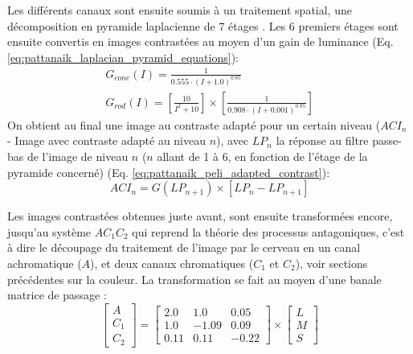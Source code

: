 	\par Les différents canaux sont ensuite soumis à un traitement spatial, une décomposition en pyramide laplacienne de 7 étages \citep{burt_laplacian_1983}. Les 6 premiers étages sont ensuite convertis en images contrastées \citep{peli_contrast_1990} au moyen d'un gain de luminance (Eq. \ref{eq:pattanaik_laplacian_pyramid_equations}):
	\begin{equation}
		\begin{array}{c}
		G_{cone}(I) = \frac{1}{0.555 \cdot (I+1.0)^{0.85}}\\
		G_{rod}(I) = \left[ \frac{10}{I^2+10} \right] \times \left[ \frac{1}{0.908 \cdot (I+0.001)^{0.85}} \right]
		\end{array}
		\label{eq:pattanaik_laplacian_pyramid_equations}
	\end{equation}
	On obtient au final une image au contraste adapté pour un certain niveau ($ACI_n$ - Image avec contraste adapté au niveau $n$), avec $LP_n$ la réponse au filtre passe-bas de l'image de niveau $n$ ($n$ allant de 1 à 6, en fonction de l'étage de la pyramide concerné) (Eq. \ref{eq:pattanaik_peli_adapted_contrast}):
	\begin{equation}
		ACI_n = G(LP_{n+1}) \times \left[ LP_n - LP_{n+1} \right]
		\label{eq:pattanaik_peli_adapted_contrast}
	\end{equation}
	
	\par Les images contrastées obtenues juste avant, sont ensuite transformées encore, jusqu'au système $AC_1C_2$ qui reprend la théorie des processus antagoniques, c'est à dire le découpage du traitement de l'image par le cerveau en un canal achromatique ($A$), et deux canaux chromatiques ($C_1$ et $C_2$), voir sections précédentes sur la couleur. La transformation se fait au moyen d'une banale matrice de passage \citep{hunt_reproduction_1995,fairchild_color_1998}:
	\begin{equation}
		\left[ \begin{array}{c}A\\ C_1\\ C_2\end{array} \right] = \left[ \begin{array}{ccc}
		2.0 & 1.0 & 0.05\\
		1.0 & -1.09 & 0.09\\
		0.11 & 0.11 & -0.22		
		\end{array} \right] \times \left[ \begin{array}{c}L\\ M\\ S\end{array} \right]
		\label{eq:pattanaik_linear_transform_lms_to_ac1c2}
	\end{equation}
	
